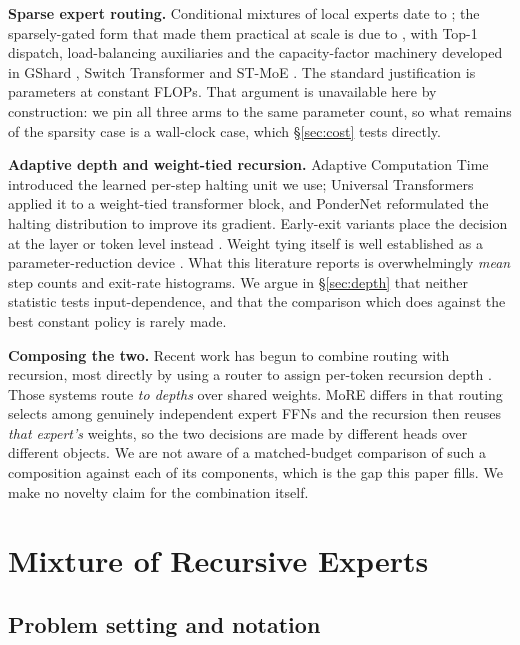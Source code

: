 \documentclass{article}
\begin{document}
\textbf{Sparse expert routing.} Conditional mixtures of local experts date
to \citet{jacobs1991moe}; the sparsely-gated form that made them practical at
scale is due to \citet{shazeer2017moe}, with Top-1 dispatch, load-balancing
auxiliaries and the capacity-factor machinery developed in GShard
\citep{lepikhin2021gshard}, Switch Transformer \citep{fedus2022switch} and
ST-MoE \citep{zoph2022stmoe}. The standard justification is parameters at
constant FLOPs. That argument is unavailable here by construction: we pin all
three arms to the same parameter count, so what remains of the sparsity case
is a wall-clock case, which \S\ref{sec:cost} tests directly.

\textbf{Adaptive depth and weight-tied recursion.} Adaptive Computation
Time \citep{graves2016act} introduced the learned per-step halting unit we
use; Universal Transformers \citep{dehghani2019ut} applied it to a weight-tied
transformer block, and PonderNet \citep{banino2021pondernet} reformulated the
halting distribution to improve its gradient. Early-exit variants place the
decision at the layer or token level instead \citep{elbayad2020depthadaptive,
schuster2022calm,raposo2024mod}. Weight tying itself is well established as a
parameter-reduction device \citep{lan2020albert}. What this literature reports
is overwhelmingly \emph{mean} step counts and exit-rate histograms. We argue
in \S\ref{sec:depth} that neither statistic tests input-dependence, and that
the comparison which does  against the best constant policy  is rarely
made.

\textbf{Composing the two.} Recent work has begun to combine routing with
recursion, most directly by using a router to assign per-token recursion
depth \citep{bae2025mor,raposo2024mod}. Those systems route \emph{to depths}
over shared weights. MoRE differs in that routing selects among genuinely
independent expert FFNs and the recursion then reuses \emph{that expert's}
weights, so the two decisions are made by different heads over different
objects. We are not aware of a matched-budget comparison of such a composition
against each of its components, which is the gap this paper fills. We make no
novelty claim for the combination itself.

\section{Mixture of Recursive Experts}
\label{sec:more}

\subsection{Problem setting and notation}
\end{document}
